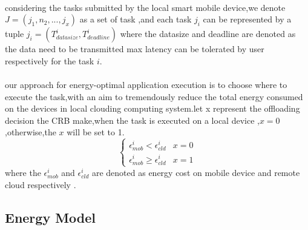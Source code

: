 \documentclass[review]{elsarticle}
\begin{document}
        \paragraph{} considering the tasks submitted by the local smart mobile device,we denote \begin{math}J=(j_{1},n_{2},...,j_{x})\end{math} as a set of task ,and each task \begin{math} j_{i} \end{math} can be represented by a tuple \begin{math}j_{i}=(T_{datasize}^i,T_{deadline}^i) \end{math} where the datasize and deadline are denoted as the data need to be transmitted max latency can be tolerated by user respectively  for the task \begin{math} i\end{math}.
        \paragraph{} our approach for energy-optimal application execution is  to choose where to execute the task,with an aim to tremendously reduce the total energy consumed on the devices in local clouding computing system.let x represent the offloading decision the CRB make,when the task is executed on a local device ,\begin{math} x=0\end{math},otherwise,the \begin{math} x\end{math} will be set to 1.
        $$\begin{cases}
        {\epsilon_{mob}^i}<{\epsilon_{cld}^i} & x = 0\\
        {\epsilon_{mob}^i}\geq{\epsilon_{cld}^i} & x = 1\end
        {cases}$$
        where the \begin{math}\epsilon_{mob}^i \end{math} and  \begin{math}\epsilon_{cld}^i \end{math} are denoted as energy cost on mobile device and remote cloud respectively .
        \subsection{Energy Model}
\end{document}
